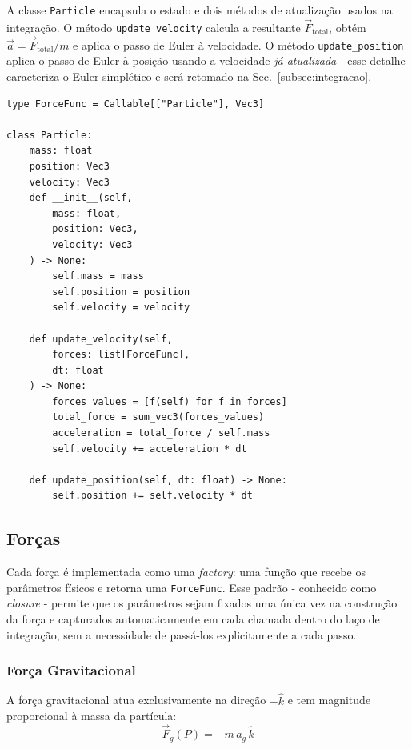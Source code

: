 A classe \texttt{Particle} encapsula o estado e dois métodos de atualização usados na integração. O método \texttt{update\_velocity} calcula a resultante $\vec{F}_\text{total}$, obtém $\vec{a} = \vec{F}_\text{total}/m$ e aplica o passo de Euler à velocidade. O método \texttt{update\_position} aplica o passo de Euler à posição usando a velocidade \emph{já atualizada} - esse detalhe caracteriza o Euler simplético e será retomado na Sec.~\ref{subsec:integracao}.

\begin{lstlisting}[caption={Estado do sistema: tipo ForceFunc e classe Particle}, label={lst:particle}]
type ForceFunc = Callable[["Particle"], Vec3]

class Particle:
    mass: float
    position: Vec3
    velocity: Vec3
    def __init__(self,
        mass: float,
        position: Vec3,
        velocity: Vec3
    ) -> None:
        self.mass = mass
        self.position = position
        self.velocity = velocity

    def update_velocity(self,
        forces: list[ForceFunc],
        dt: float
    ) -> None:
        forces_values = [f(self) for f in forces]
        total_force = sum_vec3(forces_values)
        acceleration = total_force / self.mass
        self.velocity += acceleration * dt

    def update_position(self, dt: float) -> None:
        self.position += self.velocity * dt
\end{lstlisting}

\subsection{Forças}

Cada força é implementada como uma \emph{factory}: uma função que recebe os parâmetros físicos e retorna uma \texttt{ForceFunc}. Esse padrão - conhecido como \emph{closure} - permite que os parâmetros sejam fixados uma única vez na construção da força e capturados automaticamente em cada chamada dentro do laço de integração, sem a necessidade de passá-los explicitamente a cada passo.

\subsubsection{Força Gravitacional}

A força gravitacional atua exclusivamente na direção $-\hat{k}$ e tem magnitude proporcional à massa da partícula:
\begin{equation}
    \vec{F}_g(P) = -m\,a_g\,\hat{k}
\end{equation}

